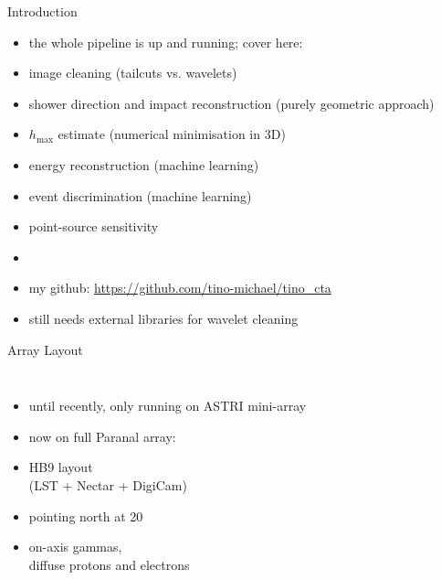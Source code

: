 \documentclass[8pt]{beamer}
\begin{document}
    \begin{frame}
        \titlepage
    \end{frame}



    \begin{frame}{Introduction}
        \begin{itemize}
            \item[] the whole pipeline is up and running; cover here:
            \item image cleaning (tailcuts vs. wavelets)
            \item shower direction and impact reconstruction (purely geometric approach)
            \item $h_\mathrm{max}$ estimate (numerical minimisation in 3D)
            \item energy reconstruction (machine learning)
            \item event discrimination (machine learning)
            \item point-source sensitivity
            \item[]
            \item my github: \url{https://github.com/tino-michael/tino_cta}
            \item still needs external libraries for wavelet cleaning
        \end{itemize}

    \end{frame}


    \begin{frame}{Array Layout}
        \begin{columns}
                \setlength{\figureheight}{\textwidth}
                \setlength{\figurewidth}{\textwidth}
                
                \begin{itemize}
                    \item until recently, only running on ASTRI mini-array
                    \item now on full Paranal array:
                    \item HB9 layout\\ (LST + Nectar + DigiCam)
                    \item pointing north at \unit{20}{\degree}
                    \item on-axis gammas,\\ diffuse protons and electrons
                \end{itemize}
        \end{columns}
    \end{frame}
\end{document}
